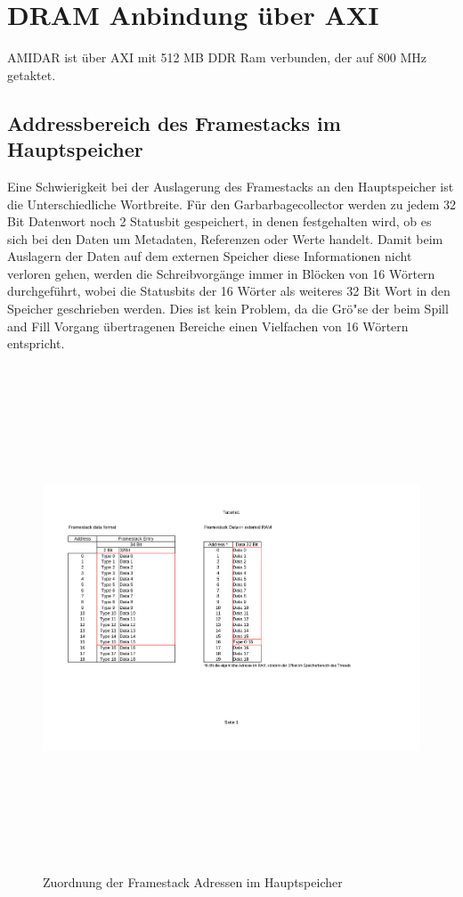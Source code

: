 \section{DRAM Anbindung \"uber AXI}
AMIDAR ist \"uber AXI mit 512 MB DDR Ram verbunden, der auf 800 MHz getaktet.


\subsection{Addressbereich des Framestacks im Hauptspeicher}
Eine Schwierigkeit bei der Auslagerung des Framestacks an den Hauptspeicher ist die Unterschiedliche Wortbreite. 
F\"ur den Garbarbagecollector werden zu jedem 32 Bit Datenwort noch 2 Statusbit gespeichert, in denen festgehalten wird, ob es sich bei den Daten um Metadaten, Referenzen oder Werte handelt. Damit beim Auslagern der Daten auf dem externen Speicher diese Informationen nicht verloren gehen, werden die Schreibvorg\"ange immer in Bl\"ocken von 16 W\"ortern durchgef\"uhrt, wobei die Statusbits der 16 W\"orter als weiteres 32 Bit Wort in den Speicher geschrieben werden. Dies ist kein Problem, da die Gr\"o"se der beim Spill and Fill Vorgang \"ubertragenen Bereiche einen Vielfachen von 16 W\"ortern entspricht. 

\begin{figure}[H]
	\centering
	\includegraphics[height = 15cm]{PS_RS_graphics/FSBlocksinRam.pdf}
	\caption{Zuordnung der Framestack Adressen im Hauptspeicher}
\end{figure}


